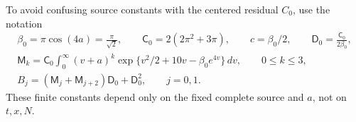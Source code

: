 \documentclass[11pt]{article}
\numberwithin{equation}{section}
\theoremstyle{definition}
\theoremstyle{remark}
\newcommand{\dd}{\,d}
\begin{document}
To avoid confusing source constants with the centered residual $C_0$,
use the notation
\begin{equation}
 \begin{gathered}
 \beta_0=\pi\cos(4a)=\frac\pi{\sqrt2},\qquad
 \mathsf C_0=2(2\pi^2+3\pi),\qquad
 c=\beta_0/2,\qquad \mathsf D_0=\frac{\mathsf C_0}{2\beta_0},\\
 \mathsf M_k=\mathsf C_0\int_0^\infty(v+a)^k
   \exp\{v^2/2+10v-\beta_0e^{4v}\}\dd v,\qquad 0\le k\le3,\\
 B_j=(\mathsf M_j+\mathsf M_{j+2})\mathsf D_0+\mathsf D_0^2,
 \qquad j=0,1.
 \end{gathered}
 \label{eq:signed-cutoff-constants}
\end{equation}
These finite constants depend only on the fixed complete source and
$a$, not on $t,x,N$.
\end{document}
